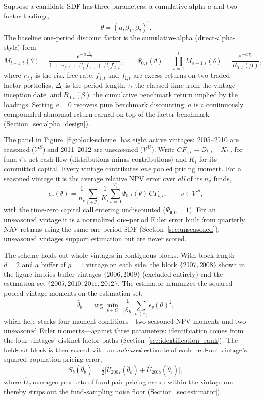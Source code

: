 \documentclass[11pt]{article}
\begin{document}
Suppose a candidate SDF has three parameters: a cumulative alpha \(a\) and two factor loadings,
\[
\theta=(a,\beta_1,\beta_2)^\prime.
\]
The baseline one-period discount factor is the cumulative-alpha (direct-alpha-style) form
\[
M_{t-1,t}(\theta)
=
\frac{e^{-a\,\Delta_t}}{1+r_{f,t}+\beta_1 f_{1,t}+\beta_2 f_{2,t}},
\qquad
\Psi_{0,t}(\theta)=\prod_{s=1}^{t} M_{s-1,s}(\theta)
=
\frac{e^{-a\,\tau_t}}{B_{0,t}(\beta)},
\]
where \(r_{f,t}\) is the risk-free rate, \(f_{1,t}\) and \(f_{2,t}\) are excess returns on two traded factor portfolios, \(\Delta_t\) is the period length, \(\tau_t\) the elapsed time from the vintage inception date, and \(B_{0,t}(\beta)\) the cumulative benchmark return implied by the loadings. Setting \(a=0\) recovers pure benchmark discounting; \(a\) is a continuously compounded abnormal return earned on top of the factor benchmark (Section~\ref{sec:alpha_design}).

The panel in Figure~\ref{fig:block-scheme} has eight active vintages: 2005--2010 are seasoned (\(\mathcal V^S\)) and 2011--2012 are unseasoned (\(\mathcal V^U\)). Write \(CF_{t,i}=D_{t,i}-X_{t,i}\) for fund \(i\)'s net cash flow (distributions minus contributions) and \(K_i\) for its committed capital. Every vintage contributes \emph{one} pooled pricing moment. For a seasoned vintage it is the average relative NPV error over \emph{all} of its \(n_v\) funds,
\[
\epsilon_{v}(\theta)
=
\frac{1}{n_v}
\sum_{i\in\mathcal I_v}
\frac{1}{K_i}
\sum_{t=0}^{T_i}
\Psi_{0,t}(\theta)\,CF_{t,i},
\qquad v\in\mathcal V^S,
\]
with the time-zero capital call entering undiscounted (\(\Psi_{0,0}=1\)). For an unseasoned vintage it is a normalized one-period Euler error built from quarterly NAV returns using the same one-period SDF (Section~\ref{sec:unseasoned}); unseasoned vintages support estimation but are never scored.

The scheme holds out whole vintages in contiguous blocks. With block length \(d=2\) and a buffer of \(g=1\) vintage on each side, the block \(\{2007,2008\}\) shown in the figure implies buffer vintages \(\{2006,2009\}\) (excluded entirely) and the estimation set \(\{2005,2010,2011,2012\}\). The estimator minimizes the squared pooled vintage moments on the estimation set,
\[
\hat\theta_b
=
\arg\min_{\theta\in\Theta}\;
\frac{1}{|\mathcal E_b|}\sum_{v\in\mathcal E_b}\epsilon_{v}(\theta)^2 ,
\]
which here stacks four moment conditions---two seasoned NPV moments and two unseasoned Euler moments---against three parameters; identification comes from the four vintages' distinct factor paths (Section~\ref{sec:identification_rank}). The held-out block is then scored with an \emph{unbiased} estimate of each held-out vintage's squared population pricing error,
\[
S_b(\hat\theta_b)=\tfrac12\bigl[\widehat U_{2007}(\hat\theta_b)+\widehat U_{2008}(\hat\theta_b)\bigr],
\]
where \(\widehat U_v\) averages products of fund-pair pricing errors within the vintage and thereby strips out the fund-sampling noise floor (Section~\ref{sec:estimator}).
\end{document}
